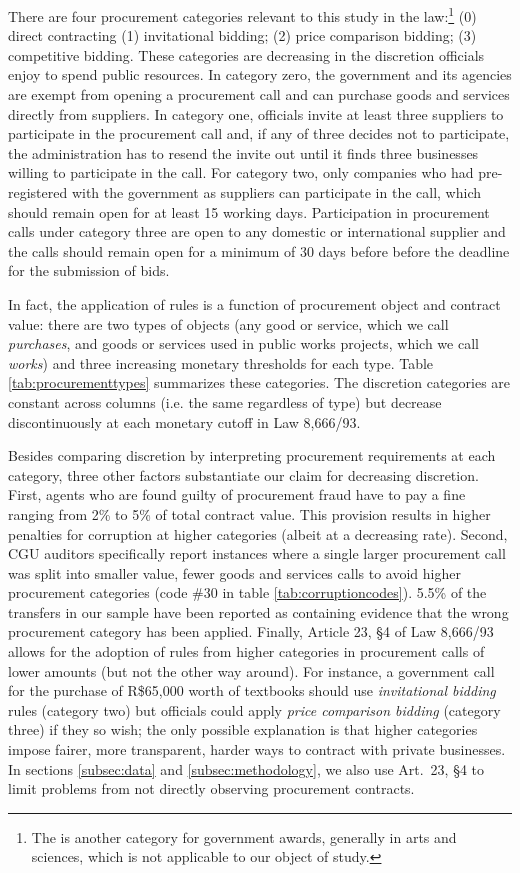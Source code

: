 \documentclass[11pt]{article}
\begin{document}
There are four procurement categories relevant to this study in the law:\footnote{The is another category for government awards, generally in arts and sciences, which is not applicable to our object of study.} (0) direct contracting (1) invitational bidding; (2) price comparison bidding; (3) competitive bidding. These categories are decreasing in the discretion officials enjoy to spend public resources. In category zero, the government and its agencies are exempt from opening a procurement call and can purchase goods and services directly from suppliers. In category one, officials invite at least three suppliers to participate in the procurement call and, if any of three decides not to participate, the administration has to resend the invite out until it finds three businesses willing to participate in the call. For category two, only companies who had pre-registered with the government as suppliers can participate in the call, which should remain open for at least 15 working days. Participation in procurement calls under category three are open to any domestic or international supplier and the calls should remain open for a minimum of 30 days before before the deadline for the submission of bids.

In fact, the application of rules is a function of procurement object and contract value: there are two types of objects (any good or service, which we call \emph{purchases}, and goods or services used in public works projects, which we call \emph{works}) and three increasing monetary thresholds for each type. Table \ref{tab:procurementtypes} summarizes these categories. The discretion categories are constant across columns (i.e. the same regardless of type) but decrease discontinuously at each monetary cutoff in Law 8,666/93.



Besides comparing discretion by interpreting procurement requirements at each category, three other factors substantiate our claim for decreasing discretion. First, agents who are found guilty of procurement fraud have to pay a fine ranging from 2\% to 5\% of total contract value. This provision results in higher penalties for corruption at higher categories (albeit at a decreasing rate). Second, CGU auditors specifically report instances where a single larger procurement call was split into smaller value, fewer goods and services calls to avoid higher procurement categories (code \#30 in table \ref{tab:corruptioncodes}). 5.5\% of the transfers in our sample have been
reported as containing evidence that the wrong procurement category has been applied. Finally, Article 23, \S 4 of Law 8,666/93 allows for the adoption of rules from higher categories in procurement calls of lower amounts (but not the other way around). For instance, a government call for the purchase of R\$65,000 worth of textbooks should use \emph{invitational bidding} rules (category two) but officials could apply \emph{price comparison bidding} (category three) if they so wish; the only possible explanation is that higher categories impose fairer, more transparent, harder ways to contract with private businesses. In sections \ref{subsec:data} and \ref{subsec:methodology}, we also use Art.~23, \S 4 to limit problems from not directly observing procurement contracts.
\end{document}
